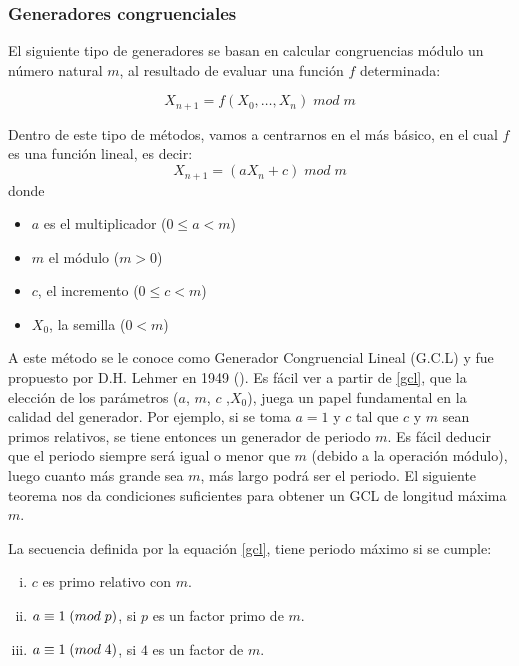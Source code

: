 \subsubsection{Generadores congruenciales}

El siguiente tipo de generadores se basan en calcular congruencias módulo un número natural $m$, al resultado de evaluar una función $f$ determinada:

\begin{equation}\label{gc}
X_{n+1}=f(X_0,\ldots, X_n)\;mod\;m
\end{equation}

Dentro de este tipo de métodos, vamos a centrarnos en el más básico, en el cual $f$ es una función lineal, es decir:
\begin{equation}\label{gcl}
X_{n+1}=(aX_n+c)\;mod\;m	
\end{equation}
donde 
\begin{itemize}
\item $a$ es el multiplicador ($0\leq a<m$)
\item $m$ el módulo ($m>0$)
\item $c$, el incremento ($0\leq c < m$)
\item $X_0$, la semilla ($0 < m$)
\end{itemize}

A este método se le conoce como Generador Congruencial Lineal (G.C.L) y fue propuesto por D.H. Lehmer en 1949 (\cite{lehmer1951}). Es fácil ver a partir de \eqref{gcl}, que la elección de los parámetros ($a$, $m$, $c$ ,$X_0$), juega un papel fundamental en la calidad del generador. Por ejemplo, si se toma  $a=1$ y $c$ tal que $c$ y $m$ sean primos relativos, se tiene entonces un generador de periodo $m$. Es fácil deducir que el periodo siempre será igual o menor que $m$ (debido a la operación módulo), luego cuanto más grande sea $m$, más largo podrá ser el periodo. El siguiente teorema nos da condiciones suficientes para obtener un GCL de longitud máxima $m$.

\begin{theorem}
La secuencia definida por la equación \eqref{gcl}, tiene periodo máximo si se cumple:
\begin{enumerate}[(i)]
\item $c$ es primo relativo con $m$.
\item $a \equiv 1 \;(mod \; p)$, si $p$ es un factor primo de $m$.
\item $a \equiv 1 \;(mod \; 4)$, si $4$ es un factor de $m$.
\end{enumerate}
\end{theorem}

